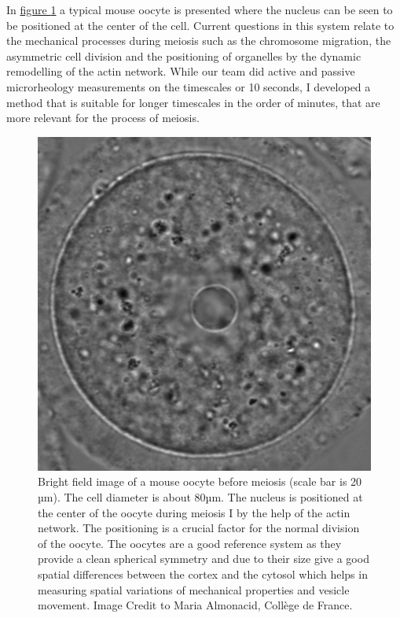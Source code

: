 \documentclass[A4paperpaper,11pt,english]{sphinxmanual}
\begin{document}
In \hyperref[index-latex:oocytewt]{figure  \ref*{index-latex:oocytewt}} a typical mouse
oocyte is presented where the nucleus can be seen to be positioned at the center of the cell.
Current questions in this system relate to the mechanical processes during meiosis such as the chromosome migration,
the asymmetric cell division and the positioning of organelles by the dynamic remodelling of the actin network.
While our team did active and passive microrheology measurements on the timescales or 10 seconds, I developed a
method that is suitable for longer timescales in the order of minutes, that are more relevant for the process of meiosis.
\begin{figure}[htbp]
\centering
\capstart

\includegraphics[width=0.600\linewidth]{oocyte-wild-type.png}
\caption{Bright field image of a mouse oocyte before meiosis (scale bar is 20 µm).
The cell diameter is about 80µm. The nucleus is positioned at the center of
the oocyte during meiosis I by the help of the actin network. The
positioning is a crucial factor for the normal division of the oocyte. The
oocytes are a good reference system as they provide a clean spherical
symmetry and due to their size give a good spatial differences between the
cortex and the cytosol which helps in measuring spatial variations of
mechanical properties and vesicle movement.  Image Credit to Maria
Almonacid, Collège de France.}\label{index-latex:oocytewt}\end{figure}
\end{document}
